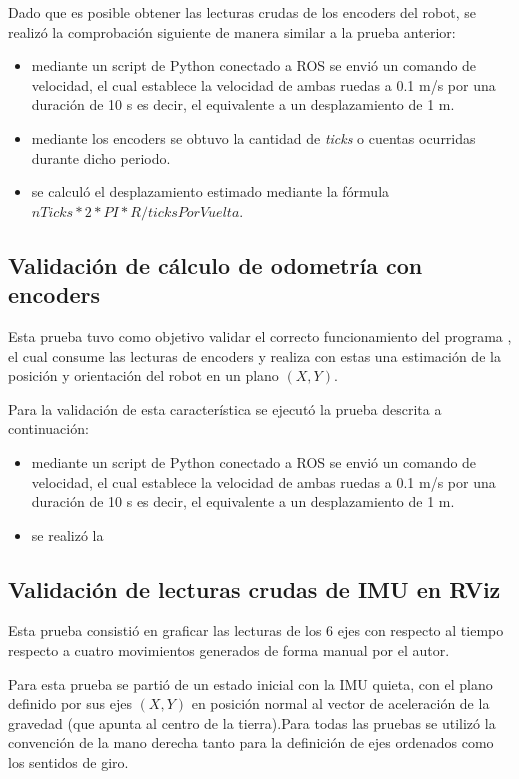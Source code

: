 Dado que es posible obtener las lecturas crudas de los encoders del robot, se realizó la comprobación siguiente de manera similar a la prueba anterior:

\begin{itemize}
    \item mediante un script de Python conectado a ROS se envió un comando de velocidad, el cual establece la velocidad de ambas ruedas a 0.1 m/s por una duración de 10 s es decir, el equivalente a un desplazamiento de 1 m.
    \item mediante los encoders se obtuvo la cantidad de \textit{ticks} o cuentas ocurridas durante dicho periodo.
    \item se calculó el desplazamiento estimado mediante la fórmula $nTicks * 2 * PI * R / ticksPorVuelta$.
\end{itemize}

\subsection{Validación de cálculo de odometría con encoders}

Esta prueba tuvo como objetivo validar el correcto funcionamiento del programa , el cual consume las lecturas de encoders y realiza con estas una estimación de la posición y orientación del robot en un plano $(X,Y)$.

Para la validación de esta característica se ejecutó la prueba descrita a continuación:

\begin{itemize}
    \item mediante un script de Python conectado a ROS se envió un comando de velocidad, el cual establece la velocidad de ambas ruedas a 0.1 m/s por una duración de 10 s es decir, el equivalente a un desplazamiento de 1 m.
    \item se realizó la
\end{itemize}

\subsection{Validación de lecturas crudas de IMU en RViz}

Esta prueba consistió en graficar las lecturas de los 6 ejes con respecto al tiempo respecto a cuatro movimientos generados de forma manual por el autor.

Para esta prueba se partió de un estado inicial con la IMU quieta, con el plano definido por sus ejes $(X,Y)$ en posición normal al vector de aceleración de la gravedad (que apunta al centro de la tierra).Para todas las pruebas se utilizó la convención de la mano derecha tanto para la definición de ejes ordenados como los sentidos de giro.

